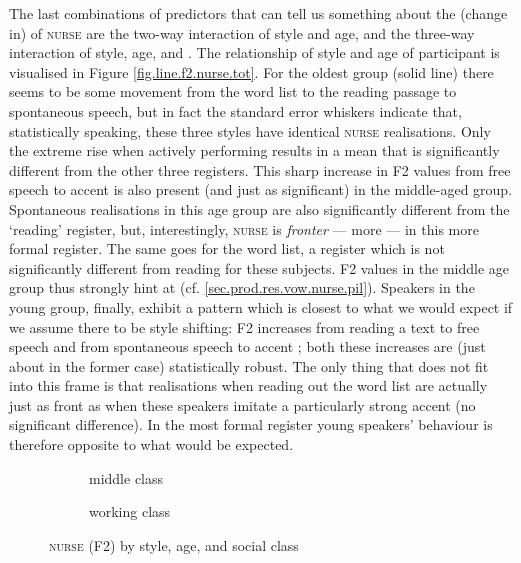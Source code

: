 The last combinations of predictors that can tell us something about the (change in)  of \textsc{nurse} are the two-way interaction of style and age, and the three-way interaction of style, age, and .
The relationship of style and age of participant is visualised in Figure \ref{fig.line.f2.nurse.tot}.
For the oldest group (solid line) there seems to be some movement from the word list to the reading passage to spontaneous speech, but in fact the standard error whiskers indicate that, statistically speaking, these three styles have identical \textsc{nurse} realisations.
Only the extreme rise when actively performing  results in a mean that is significantly different from the other three registers.
This sharp increase in F2 values from free speech to accent  is also present (and just as significant) in the middle-aged group.
Spontaneous realisations in this age group are also significantly different from the `reading' register, but, interestingly, \textsc{nurse} is \emph{fronter} --- more  --- in this more formal register.
The same goes for the word list, a register which is not significantly different from reading for these subjects.
F2 values in the middle age group thus strongly hint at  (cf. \ref{sec.prod.res.vow.nurse.pil}).
Speakers in the young group, finally, exhibit a pattern which is closest to what we would expect if we assume there to be style shifting: F2 increases from reading a text to free speech and from spontaneous speech to accent ; both these increases are (just about in the former case) statistically robust.
The only thing that does not fit into this frame is that realisations when reading out the word list are actually just as front as when these speakers imitate a particularly strong  accent (no significant difference).
In the most formal register young speakers' behaviour is therefore opposite to what would be expected.

\begin{figure}[h!]
	\centering
	\begin{subfigure}{.49\textwidth}
		\centering
			\resizebox{\linewidth}{!}{} 
		\caption{middle class}
		\label{fig.line.f2.nurse.mc}
	\end{subfigure}
	\begin{subfigure}{.49\textwidth}
		\centering
			\resizebox{\linewidth}{!}{} 
		\caption{working class}
		\label{fig.line.f2.nurse.wc}
	\end{subfigure}
	\caption{\textsc{nurse} (F2) by style, age, and social class}
\end{figure}

